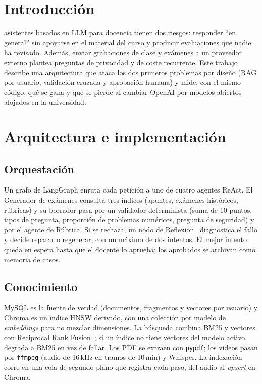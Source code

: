 \documentclass[journal]{IEEEtran}
\begin{document}
\IEEEpeerreviewmaketitle

\section{Introducción}
 asistentes basados en LLM para docencia tienen dos riesgos: responder
``en general'' sin apoyarse en el material del curso y producir evaluaciones que nadie ha
revisado. Además, enviar grabaciones de clase y exámenes a un proveedor externo plantea
preguntas de privacidad y de coste recurrente. Este trabajo describe una arquitectura que
ataca los dos primeros problemas por diseño (RAG por usuario, validación cruzada y
aprobación humana) y mide, con el mismo código, qué se gana y qué se pierde al cambiar
OpenAI por modelos abiertos alojados en la universidad.

\section{Arquitectura e implementación}
\subsection{Orquestación}
Un grafo de LangGraph enruta cada petición a uno de cuatro agentes ReAct. El Generador de
exámenes consulta tres índices (apuntes, exámenes históricos, rúbricas) y su borrador pasa
por un validador determinista (suma de 10 puntos, tipos de pregunta, proporción de
problemas numéricos, pregunta de seguridad) y por el agente de Rúbrica. Si se rechaza, un
nodo de Reflexion~\cite{shinn2023} diagnostica el fallo y decide reparar o regenerar, con
un máximo de dos intentos. El mejor intento queda en espera hasta que el docente lo
aprueba; los aprobados se archivan como memoria de casos.

\subsection{Conocimiento}
MySQL es la fuente de verdad (documentos, fragmentos y vectores por usuario) y Chroma es un
índice HNSW derivado, con una colección por modelo de \emph{embeddings} para no mezclar
dimensiones. La búsqueda combina BM25 y vectores con Reciprocal Rank
Fusion~\cite{cormack2009}; si un índice no tiene vectores del modelo activo, degrada a
BM25 en vez de fallar. Los PDF se extraen con \texttt{pypdf}; los vídeos pasan por
\texttt{ffmpeg} (audio de 16\,kHz en tramos de 10\,min) y Whisper. La indexación corre en
una cola de segundo plano que registra cada paso, del audio al \emph{upsert} en Chroma.
\end{document}
